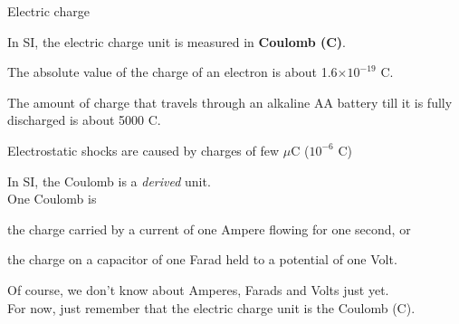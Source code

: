 \begin{frame}{Electric charge}

In SI, the electric charge unit is measured in {\bf Coulomb (C)}.\\
\vspace{0.1cm}

\begin{itemize}
{\small
\item
The absolute value of the charge of an electron is about 1.6$\times 10^{-19}$ C.
\item
The amount of charge that travels through an alkaline AA battery till it is fully discharged is about 5000 C.
\item
Electrostatic shocks are caused by charges of few $\mu$C ($10^{-6}$ C)
}
\end{itemize}

\vspace{0.3cm}

In SI, the Coulomb is a {\em derived} unit.\\
\vspace{0.3cm}
One Coulomb is\\
\vspace{0.1cm}
\begin{itemize}
{\small
\item
   the charge carried by a current of one Ampere flowing for one second, or
\item
   the charge on a capacitor of one Farad held to a potential of one Volt.
}
\end{itemize}

\vspace{0.1cm}

Of course, we don't know about Amperes, Farads and Volts just yet.\\
For now, just remember that the electric charge unit is the Coulomb (C).

\end{frame}

%
%
%

